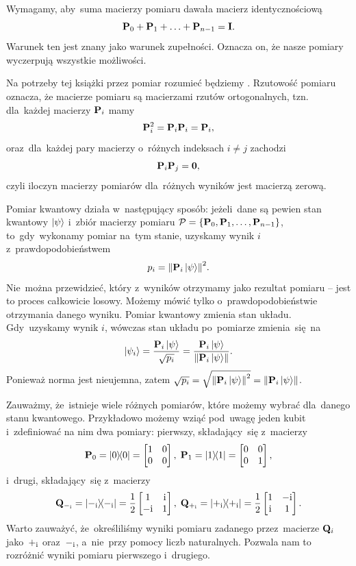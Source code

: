 Wymagamy, aby~suma macierzy pomiaru dawała macierz identycznościową
$$
	\mathbf{P}_0+\mathbf{P}_1+\ldots+\mathbf{P}_{n-1}=\mathbf{I}.
$$
Warunek ten jest znany jako warunek zupełności. Oznacza on, że nasze
pomiary wyczerpują wszystkie możliwości.

Na potrzeby tej książki przez pomiar rozumieć będziemy . Rzutowość pomiaru oznacza, że macierze
pomiaru są macierzami rzutów ortogonalnych, tzn. dla~każdej macierzy
$\mathbf{P}_i$ mamy
$$
	\mathbf{P}_i^2=\mathbf{P}_i \mathbf{P}_i=\mathbf{P}_i,
$$
oraz~dla~każdej pary macierzy o~różnych indeksach $i\neq j$ zachodzi
$$
	\mathbf{P}_i \mathbf{P}_j=\mathbf{0},
$$
czyli iloczyn macierzy pomiarów dla~różnych wyników jest macierzą zerową.

Pomiar kwantowy działa w~następujący sposób: jeżeli~dane są pewien stan kwantowy $\ket{\psi}$
i~zbiór macierzy pomiaru $\mathcal{P}=\{\mathbf{P}_0,\mathbf{P}_1, \ldots, \mathbf{P}_{n-1}\}$,
to~gdy~wykonamy pomiar na~tym stanie, uzyskamy wynik $i$ z~prawdopodobieństwem
$$
	p_i=\norm{\mathbf{P}_i\ket{\psi}}^2.
$$
Nie~można przewidzieć, który z~wyników otrzymamy jako rezultat pomiaru -- jest to proces całkowicie losowy. Możemy
mówić tylko o~prawdopodobieństwie otrzymania danego wyniku. Pomiar kwantowy zmienia stan układu.
Gdy~uzyskamy wynik $i$, wówczas stan układu po~pomiarze zmienia~się~na
$$
	\ket{\psi_i} = \frac{\mathbf{P}_i\ket{\psi}}{\sqrt{p_i}} = \frac{\mathbf{P}_i\ket{\psi}}{\norm{\mathbf{P}_i\ket{\psi}}}.
$$
Ponieważ norma jest nieujemna, zatem $\sqrt{p_i} = \sqrt{\norm{\mathbf{P}_i\ket{\psi}}^2}=\norm{\mathbf{P}_i\ket{\psi}}$.

Zauważmy, że~istnieje wiele różnych pomiarów, które możemy wybrać dla~danego stanu kwantowego.
Przykładowo możemy wziąć pod~uwagę jeden kubit i~zdefiniować na nim dwa pomiary: pierwszy, składający~się z~macierzy
$$
	\mathbf{P}_0=\ketbra{0}{0}=\begin{bmatrix} 1 & 0 \\ 0 & 0 \end{bmatrix},\;
	\mathbf{P}_1=\ketbra{1}{1}=\begin{bmatrix} 0 & 0 \\ 0 & 1 \end{bmatrix},
$$
i~drugi, składający~się z~macierzy
$$
	\mathbf{Q}_{-_{\mathrm i}}=\ketbra{-_{\mathrm i}}{-_{\mathrm i}}=\frac{1}{2}\begin{bmatrix} 1 & {\mathrm i} \\ -{\mathrm i} & 1 \end{bmatrix},\;
	\mathbf{Q}_{+_{\mathrm i}}=\ketbra{+_{\mathrm i}}{+_{\mathrm i}}=\frac{1}{2}\begin{bmatrix} 1 & -{\mathrm i} \\ {\mathrm i} & 1 \end{bmatrix}.
$$
Warto zauważyć, że~określiliśmy wyniki pomiaru zadanego przez~macierze
$\mathbf{Q}_i$ jako~$+_{\mathrm i}$ oraz~$-_{\mathrm i}$, a~nie~przy pomocy liczb naturalnych.
Pozwala nam to rozróżnić wyniki pomiaru pierwszego i~drugiego.

